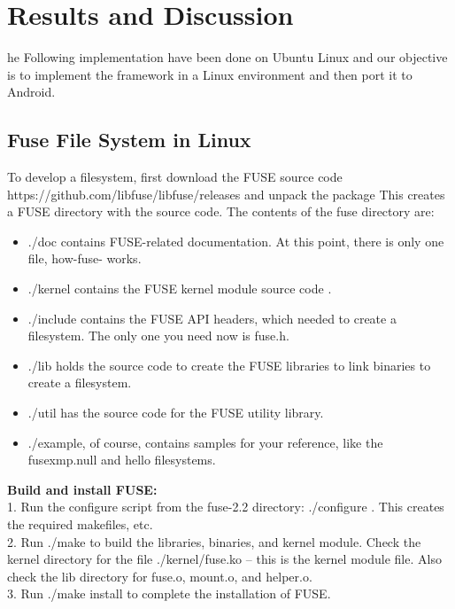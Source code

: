 %
%
\let\textcircled=\pgftextcircled
\chapter{Results and Discussion}
\label{chap:results}
he Following implementation have been done on Ubuntu Linux and our objective is to implement the framework in a Linux environment and then port it to Android.

\section{Fuse File System in Linux}

To develop a filesystem, first download the FUSE source code https://github.com/libfuse/libfuse/releases  and unpack the package This creates a FUSE directory with the source code. The
contents of the fuse directory are:
\begin{itemize}
\item ./doc contains FUSE-related documentation. At this point, there is only one file, how-fuse-
works.
\item  ./kernel contains the FUSE kernel module source code .
\item  ./include contains the FUSE API headers, which  needed to create a filesystem. The only
one you need now is fuse.h.
 \item ./lib holds the source code to create the FUSE libraries to link binaries to create a filesystem.
\item ./util has the source code for the FUSE utility library.
 \item ./example, of course, contains samples for your reference, like the fusexmp.null and hello
filesystems.\\
\end{itemize}
\textbf{Build and install FUSE:}\\
1. Run the configure script from the fuse-2.2 directory: ./configure . This creates the required
makefiles, etc.\\
2. Run ./make to build the libraries, binaries, and kernel module. Check the kernel directory for
the file ./kernel/fuse.ko -- this is the kernel module file. Also check the lib directory for fuse.o,
mount.o, and helper.o.\\
3. Run ./make install to complete the installation of FUSE.\\

